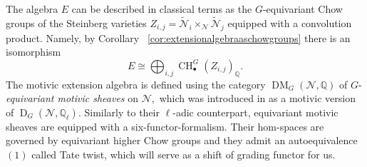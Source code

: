 \documentclass{amsart}
\theoremstyle{plain}
\theoremstyle{TheoremNum}
\theoremstyle{definition}
\theoremstyle{remark}
\numberwithin{equation}{section}
\newcommand{\Q}{\mathbb{Q}}
\newcommand{\M}{\widetilde{\mathcal{N}}}
\newcommand{\N}{\mathcal{N}}
\newcommand{\Chow}{\operatorname{CH}}
\newcommand{\D}{\operatorname{D}}
\newcommand{\DM}{\operatorname{DM}}
\begin{document}
The algebra $E$ can be described in classical terms as the $G$-equivariant Chow groups of the Steinberg varieties $Z_{i,j}=\M_i\times_{\N}\M_j$ equipped with a convolution product. Namely, by Corollary ~\ref{cor:extensionalgebraaschowgroups} there is an isomorphism
$$
    E\cong\bigoplus_{i,j}\Chow_{\bullet}^G(Z_{i,j})_\Q.
$$
The motivic extension algebra is defined using the category $\DM_G(\N,\Q)$ of $G$-\emph{equivariant motivic sheaves} on $\N,$ which was introduced in \cite{soergel_equivariant_2018} as a motivic version of $\D_G(\N,\Q_\ell).$ Similarly to their $\ell$-adic counterpart, equivariant motivic sheaves are equipped with a six-functor-formalism. Their hom-spaces are governed by equivariant higher Chow groups and they admit an autoequivalence $(1)$ called  Tate twist, which will serve as a shift of grading functor for us.
\end{document}
